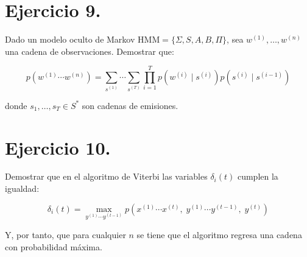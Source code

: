 \documentclass[12pt,letterpaper]{article}
\begin{document}
\bigskip



\newpage

\section{Ejercicio 9.}
Dado un modelo oculto de Markov $\mathrm{HMM} = \{\Sigma, S, A, B, \Pi\}$, sea
$w^{(1)}, \ldots, w^{(n)}$ una cadena de observaciones. Demostrar que:
 
\[
  p\!\left(w^{(1)} \cdots w^{(n)}\right)
  = \sum_{s^{(1)}} \cdots \sum_{s^{(T)}}
    \prod_{i=1}^{T}
    p\!\left(w^{(i)} \mid s^{(i)}\right)
    p\!\left(s^{(i)} \mid s^{(i-1)}\right)
\]
 
donde $s_1, \ldots, s_T \in S^{*}$ son cadenas de emisiones.

\bigskip



\newpage

\section{Ejercicio 10.}
Demostrar que en el algoritmo de Viterbi las variables $\delta_i(t)$ cumplen la igualdad:
 
\[
  \delta_i(t)
  = \max_{y^{(1)} \cdots y^{(t-1)}}
    p\!\left(x^{(1)} \cdots x^{(t)},\; y^{(1)} \cdots y^{(t-1)},\; y^{(t)}\right)
\]
 
Y, por tanto, que para cualquier $n$ se tiene que el algoritmo regresa una cadena con probabilidad
máxima.

\bigskip


\end{document}
